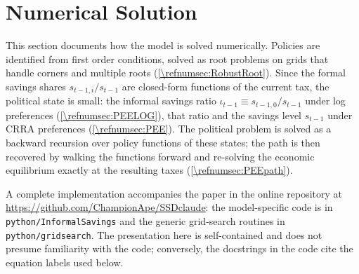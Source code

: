 \edef\refsec{\refnumsec}
\edef\refeq{\refnumeq}
\edef\refalg{\refnumalg}

\section{Numerical Solution}\label{\refsec}
This section documents how the model is solved numerically. Policies are identified from first order conditions, solved as root problems on grids that handle corners and multiple roots (\cref{\refsec:RobustRoot}). Since the formal savings shares $s_{t-1,i}/s_{t-1}$ are closed-form functions of the current tax, the political state is small: the informal savings ratio $\iota_{t-1}\equiv s_{t-1,0}/s_{t-1}$ under log preferences (\cref{\refsec:PEELOG}), that ratio and the savings level $s_{t-1}$ under CRRA preferences (\cref{\refsec:PEE}). The political problem is solved as a backward recursion over policy functions of these states; the path is then recovered by walking the functions forward and re-solving the economic equilibrium exactly at the resulting taxes (\cref{\refsec:PEEpath}).

A complete implementation accompanies the paper in the online repository at \url{https://github.com/ChampionApe/SSDclaude}: the model-specific code is in \texttt{python/InformalSavings} and the generic grid-search routines in \texttt{python/gridsearch}. The presentation here is self-contained and does not presume familiarity with the code; conversely, the docstrings in the code cite the equation labels used below.

